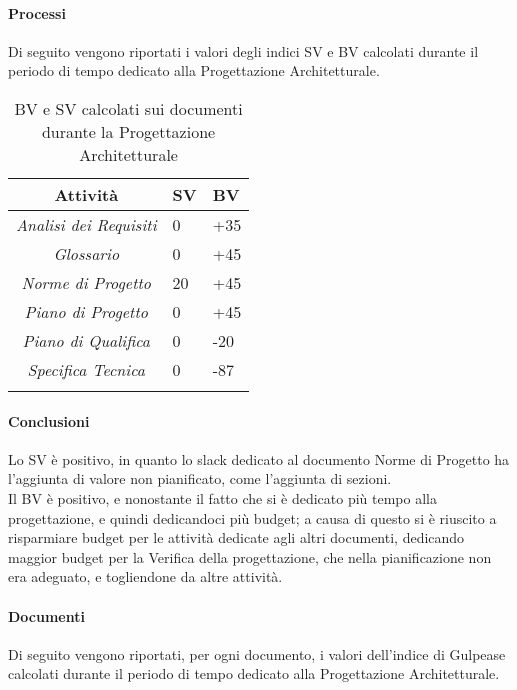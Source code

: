 \paragraph{Processi}
Di seguito vengono riportati i valori degli indici SV e BV calcolati durante il periodo di tempo dedicato alla Progettazione Architetturale.
\begin{longtable}{|c|p{3cm}|p{3cm}|}
\toprule
\textbf{Attività} & \textbf{SV} & \textbf{BV} \\


\midrule
\emph{Analisi dei Requisiti} & 0 & +35\\
\midrule
\emph{Glossario} & 0  & +45\\
\midrule
\emph{Norme di Progetto} & 20 & +45\\
\midrule
\emph{Piano di Progetto} & 0 & +45 \\
\midrule
\emph{Piano di Qualifica} & 0 & -20\\
\midrule
\emph{Specifica Tecnica} & 0 & -87\\
\bottomrule
\caption{BV e SV calcolati sui documenti durante la Progettazione Architetturale}
\label{tab:changelog}
\end{longtable}

\paragraph{Conclusioni}
Lo SV è positivo, in quanto lo slack dedicato al documento Norme di Progetto ha  l'aggiunta di valore non pianificato, come l'aggiunta di sezioni.\\
Il BV è positivo, e nonostante il fatto che si è dedicato più tempo alla progettazione, e quindi dedicandoci più budget; a causa di questo si è riuscito a risparmiare budget per le attività dedicate agli altri documenti, dedicando maggior budget per la Verifica della progettazione, che nella pianificazione non era adeguato, e togliendone da altre attività.

\paragraph{Documenti}
Di seguito vengono riportati, per ogni documento, i valori dell'indice di Gulpease calcolati durante il periodo di tempo dedicato alla Progettazione Architetturale.


